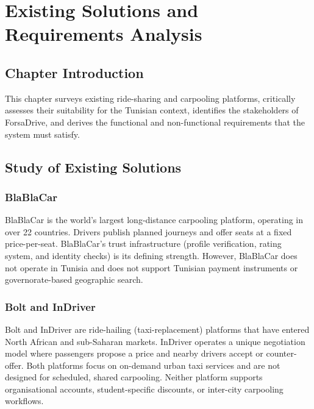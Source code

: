 \documentclass[12pt,a4paper,openright]{report}
\begin{document}
\chapter{Existing Solutions and Requirements Analysis}

\section*{Chapter Introduction}
This chapter surveys existing ride-sharing and carpooling platforms, critically assesses their suitability for the Tunisian context, identifies the stakeholders of ForsaDrive, and derives the functional and non-functional requirements that the system must satisfy.

\section{Study of Existing Solutions}

\subsection{BlaBlaCar}

BlaBlaCar \cite{blablacar} is the world's largest long-distance carpooling platform, operating in over 22 countries. Drivers publish planned journeys and offer seats at a fixed price-per-seat. BlaBlaCar's trust infrastructure (profile verification, rating system, and identity checks) is its defining strength. However, BlaBlaCar does not operate in Tunisia and does not support Tunisian payment instruments or governorate-based geographic search.

\subsection{Bolt and InDriver}

Bolt \cite{bolt} and InDriver \cite{indriver} are ride-hailing (taxi-replacement) platforms that have entered North African and sub-Saharan markets. InDriver operates a unique negotiation model where passengers propose a price and nearby drivers accept or counter-offer. Both platforms focus on on-demand urban taxi services and are not designed for scheduled, shared carpooling. Neither platform supports organisational accounts, student-specific discounts, or inter-city carpooling workflows.
\end{document}
